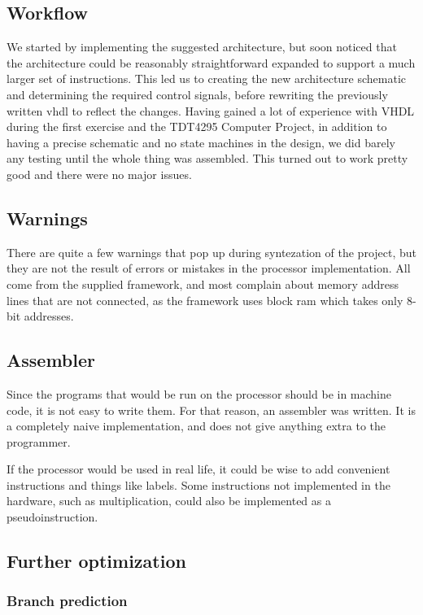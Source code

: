 \subsection{Workflow}

We started by implementing the suggested architecture, but soon noticed that the architecture could be reasonably straightforward expanded to support a much larger set of instructions.
This led us to creating the new architecture schematic and determining the required control signals, before rewriting the previously written vhdl to reflect the changes.
Having gained a lot of experience with VHDL during the first exercise and the TDT4295 Computer Project, in addition to having a precise schematic and no state machines in the design, we did barely any testing until the whole thing was assembled.
This turned out to work pretty good and there were no major issues.

\subsection{Warnings}

There are quite a few warnings that pop up during syntezation of the project, but they are not the result of errors or mistakes in the processor implementation.
All come from the supplied framework, and most complain about memory address lines that are not connected, as the framework uses block ram which takes only 8-bit addresses.

\subsection{Assembler}

Since the programs that would be run on the processor should be in machine code,
it is not easy to write them. For that reason, an assembler was written. It is a
completely naive implementation, and does not give anything extra to the
programmer. 

If the processor would be used in real life, it could be wise to add convenient
instructions and things like labels. Some instructions not implemented in the
hardware, such as multiplication, could also be implemented as a
pseudoinstruction.

\subsection{Further optimization}

\subsubsection*{Branch prediction}

